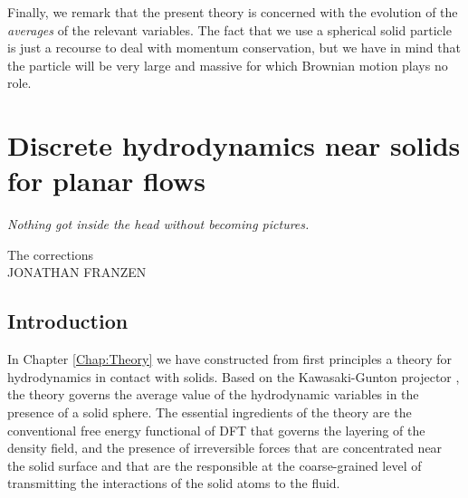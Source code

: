 \documentclass[b5paper,openright,11pt]{book}
\begin{document}
Finally, we remark that the present theory is concerned with the evolution of the \textit{averages} of the relevant variables. 
The fact that we use a spherical solid particle is just a recourse to deal with momentum conservation, but we have in mind that the particle will be very large and massive for which Brownian motion plays no role. 


\chapter{Discrete hydrodynamics near solids for planar flows}\label{Chap:Planar}
\epigraph{\textit{Nothing got inside the head without becoming pictures.}}{The corrections \\ JONATHAN FRANZEN}
\section{Introduction}
In Chapter \ref{Chap:Theory} we  have constructed  from  first
principles a theory  for hydrodynamics in contact with  solids.    Based   on    the   Kawasaki-Gunton   projector
\cite{Kawasaki1973,Grabert1982}, the theory  governs the average value
of the hydrodynamic variables in the  presence of a solid sphere.  The
essential ingredients of  the theory are the  conventional free energy
functional of DFT that governs the  layering of the density field, and
the presence  of irreversible  forces that  are concentrated  near the
solid surface and that are the responsible at the coarse-grained level
of transmitting the  interactions of the solid atoms to  the fluid. 
\end{document}
